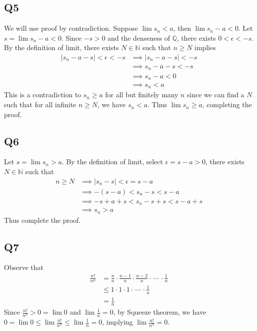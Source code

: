 \documentclass[12pt,lettersize]{article}
\theoremstyle{remark}
\newcommand{\Q}{\mathbb{Q}}
\newcommand{\N}{\mathbb{N}}
\begin{document}
\subsection*{Q5}
We will use proof by contradiction. Suppose $\lim s_n< a$, then $\lim s_n-a<0$. Let $s=\lim s_n-a<0$. Since $-s>0$ and the denseness of $\Q$, there exists $0<\epsilon<-s$. By the definition of limit, there exists $N\in\N$ such that $n\geq N$ implies
\begin{align*}
	|s_n-a-s|<\epsilon<-s &\implies |s_n-a-s|<-s\\
						  &\implies s_n-a-s<-s\\
						  &\implies s_n-a<0\\
						  &\implies s_n<a
\end{align*}
This is a contradiction to $s_n\geq a$ for all but finitely many $n$ since we can find a $N$ such that for all infinite $n\geq N$, we have $s_n<a$. Thus $\lim s_n\geq a$, completing the proof.

\newpage

\subsection*{Q6}
Let $s=\lim s_n>a$. By the definition of limit, select $\epsilon=s-a>0$, there exists $N\in\N$ such that
\begin{align*}
	n\geq N &\implies |s_n-s|<\epsilon=s-a\\
			&\implies -(s-a)<s_n-s<s-a\\
			&\implies -s+a+s<s_n-s+s<s-a+s\\
			&\implies s_n>a
\end{align*}
Thus complete the proof.

\newpage

\subsection*{Q7}
Observe that
\begin{align*}
	\frac{n!}{n^n} &= \frac{n}{n}\cdot\frac{n-1}{n}\cdot\frac{n-2}{n}\cdot\,\cdots\,\cdot\frac{1}{n}\\
				   &\leq 1\cdot1\cdot1\cdot\,\cdots\,\cdot\frac{1}{n}\\
				   &= \frac{1}{n}
\end{align*}
Since $\frac{n!}{n^n}>0=\lim0$ and $\lim\frac{1}{n}=0$, by Squeeze theorem, we have $0=\lim 0\leq\lim\frac{n!}{n^n}\leq\lim\frac{1}{n}=0$, implying $\lim\frac{n!}{n^n}=0$.
\newpage
\end{document}
